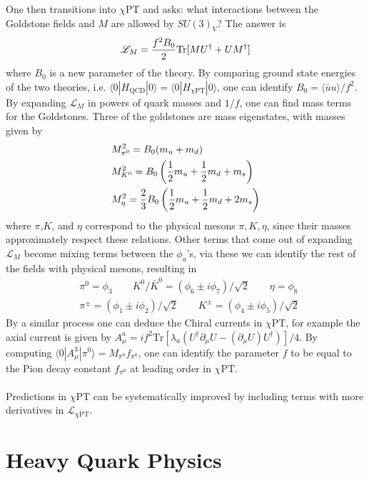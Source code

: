 One then transitions into $\chi$PT and asks: what interactions between the Goldstone fields and $M$ are allowed by $SU(3)_V$? The answer is
\begin{align}
  \mathscr{L}_M = {f^2 B_0 \over 2} \text{Tr}[ MU^{\dagger} + U M^{\dagger} ]
\end{align}
where $B_0$ is a new parameter of the theory. By comparing ground state energies of the two theories, i.e. $\langle 0 | H_{\text{QCD}} | 0 \rangle = \langle 0 | H_{\chi\text{PT}} | 0 \rangle$, one can identify $B_0 = \langle \bar{u}u \rangle/f^2$. By expanding $\mathscr{L}_M$ in powers of quark masses and $1/f$, one can find mass terms for the Goldstones. Three of the goldstones are mass eigenstates, with masses given by
\begin{align}
  &M_{\pi^0}^2 = B_0 ( m_u + m_d ) \\
  &M_{K^0}^2 = B_0 \left( {1\over2} m_u + {1\over2} m_d + m_s \right) \\
  &M_{\eta}^2 = {2\over3}B_0 \left( {1\over2} m_u + {1\over2} m_d + 2m_s \right)
\end{align}
where $\pi$,$K$, and $\eta$ correspond to the physical mesons $\pi,K,\eta$, since their masses approximately respect these relations. Other terms that come out of expanding $\mathscr{L}_{M}$ become mixing terms between the $\phi_a$'s, via these we can identify the rest of the fields with physical mesons, resulting in
\begin{align}
  &\pi^0 = \phi_3 \quad\quad K^0/\bar{K}^0 = (\phi_6 \pm i\phi_7)/\sqrt{2} \quad\quad \eta = \phi_8 \\
  &\pi^{\pm} = (\phi_1 \pm i \phi_2)/\sqrt{2} \quad\quad K^{\pm} = (\phi_4 \pm i\phi_5 )/\sqrt{2}
  \nonumber
\end{align}
By a similar process one can deduce the Chiral currents in $\chi$PT, for example the axial current is given by $A_{\mu}^a = i f^2\text{Tr}[ \lambda_a ( U^{\dagger} \partial_{\mu} U - (\partial_{\mu} U) U^{\dagger} )]/4$. By computing $\langle 0 | A^3_{\mu} | \pi^0 \rangle = M_{\pi^0} f_{\pi^0}$, one can identify the parameter $f$ to be equal to the Pion decay constant $f_{\pi^0}$ at leading order in $\chi$PT.
\\ \\
Predictions in $\chi$PT can be systematically improved by including terms with more derivatives in $\mathscr{L}_{\chi\text{PT}}$.


\section{Heavy Quark Physics}

